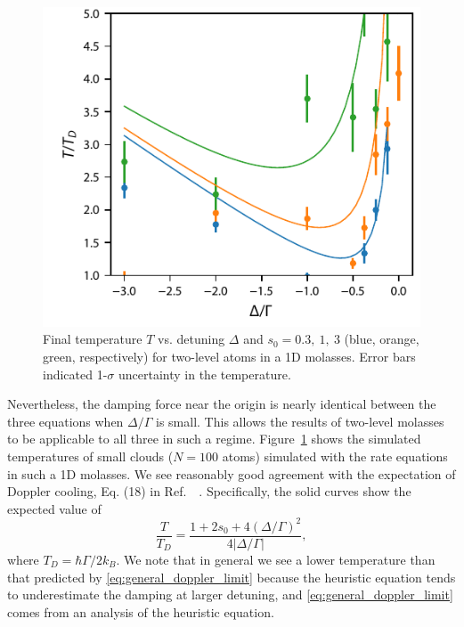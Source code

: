\documentclass[final,5p,times,twocolumn]{elsarticle}
\begin{document}
\begin{figure}
	\center
	\includegraphics{figs/final_temperature_two_level_1D_molasses_rate_eqn.pdf}
	\caption{\label{fig:doppler_limit} Final temperature $T$ vs. detuning $\Delta$ and $s_0=0.3,\ 1,\ 3$ (blue, orange, green, respectively) for two-level atoms in a 1D molasses.  Error bars indicated 1-$\sigma$ uncertainty in the temperature.}
\end{figure}

Nevertheless, the damping force near the origin is nearly identical between the three equations when $\Delta/\Gamma$ is small.  This allows the results of two-level molasses~\cite{Lett1989} to be applicable to all three in such a regime.
Figure~\ref{fig:doppler_limit} shows the simulated temperatures of small clouds ($N=100$ atoms) simulated with the rate equations in such a 1D molasses.  We see reasonably good agreement with the expectation of Doppler cooling, Eq. (18) in Ref.~~\cite{Lett1989}.  Specifically, the solid curves show the expected value of 
\begin{equation}
	\label{eq:general_doppler_limit}
	\frac{T}{T_D} = \frac{1+2s_0+4(\Delta/\Gamma)^2}{4|\Delta/\Gamma|},
\end{equation}
where $T_D = \hbar \Gamma/2k_B$.  We note that in general we see a lower temperature than that predicted by \eqref{eq:general_doppler_limit} because 
the heuristic equation tends to underestimate the damping at larger detuning, and \eqref{eq:general_doppler_limit} comes from an analysis of the heuristic equation.
\end{document}
